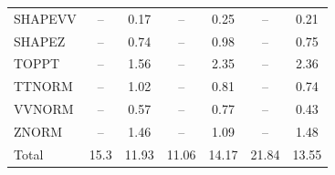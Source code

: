 \begin{table}[H]
\begin{center}
\begin{footnotesize}
\begin{tabular}{lcccccc}
				SHAPEVV & -- &  0.17 & -- &  0.25 & -- &  0.21 \\
				SHAPEZ & -- &  0.74 & -- &  0.98 & -- &  0.75 \\
				TOPPT & -- &  1.56 & -- &  2.35 & -- &  2.36 \\
				TTNORM & -- &  1.02 & -- &  0.81 & -- &  0.74 \\
				VVNORM & -- &  0.57 & -- &  0.77 & -- &  0.43 \\
				ZNORM & -- &  1.46 & -- &  1.09 & -- &  1.48 \\
				Total &  15.3  &  11.93 &  11.06  &  14.17 &  21.84  &  13.55 \\ \hline \hline
			\end{tabular}
			\label{tab:SysUncertainties_1300}
        \end{footnotesize}
	\end{center}
\end{table}


